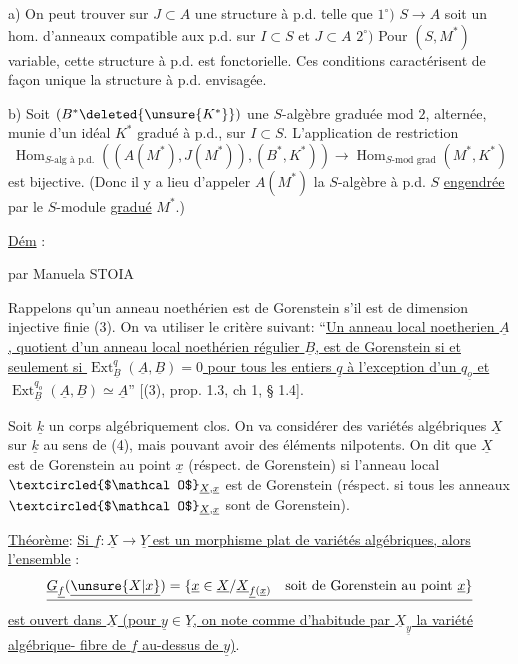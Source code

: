 a) On peut trouver sur  $J\subset A$ une structure à p.d. telle que $1^\circ)$ $S\longrightarrow A$ soit un hom. d'anneaux compatible aux p.d. sur $I\subset S$ et $J\subset A$ $2^\circ)$ Pour $(S,M^*)$ variable, cette structure à p.d. est fonctorielle. Ces conditions caractérisent de façon unique la structure à p.d. envisagée.

b) Soit $(B^*\deleted{\unsure{K^*}})$ une $S$-algèbre graduée mod $2$,  alternée, munie d'un idéal $K^*$ gradué à p.d.,   sur $I\subset S$.
L'application de restriction
\[
\operatorname{Hom}_{S\text{-alg à p.d.}}((A(M^*),J(M^*)),(B^*,K^*))
\longrightarrow\operatorname{Hom}_{S\text{-mod grad}}(M^*,K^*)
\]
est bijective. (Donc il y a lieu d'appeler $A(M^*)$ la $S$-algèbre  à p.d.  $S$ \uline{engendrée} par le $S$-module \uline{gradué} $M^*$.)

\uline{Dém} :

\begin{center}

par Manuela STOIA
\end{center}

Rappelons qu'un anneau noethérien est de Gorenstein s'il est de dimension injective finie (3). On va utiliser le critère suivant: ``\uline{Un anneau local noetherien $\underline A$, quotient d'un anneau local noethérien régulier $\underline B$, est de Gorenstein si et seulement si $\operatorname{Ext}^{q}_{\underline B}(\underline A,\underline B)=0$ pour tous les entiers $\underline q$ à l'exception d'un $q_{\underline o}$ et $\operatorname{Ext}^{q_o}_{\underline B}(\underline A,\underline B)\simeq\underline A$}'' [(3), prop. 1.3, ch 1, § 1.4].

Soit $\underline k$ un corps algébriquement clos. On va considérer des variétés algébriques $\underline X$ sur $\underline k$ au sens de (4), mais pouvant avoir des éléments nilpotents. On dit que $\underline X$ est de Gorenstein au point $\underline x$ (réspect. de Gorenstein) si l'anneau local $\textcircled{$\mathcal O$}_{\underline X,\underline x}$ est de Gorenstein (réspect. si tous les anneaux $\textcircled{$\mathcal O$}_{\underline X,\underline x}$ sont de Gorenstein).

\uline{Théorème}: \uline{Si $\underline f:\underline X\longrightarrow\underline Y$ est un morphisme plat de variétés algébriques, alors l'ensemble} :
\[
\underline{\underline G_{\underline f}(\underline{\unsure{X|x}})=\{\underline x\in\underline X/\underline X_{\underline f(\underline x)}\quad\text{soit de Gorenstein au point }\underline x\}}
\]
\uline{est ouvert dans $\underline X$ (pour $\underline y\in\underline Y$, on note comme d'habitude par $\underline X_{\underline y}$ la variété algébrique- fibre de $\underline f$ au-dessus de $\underline y$)}.

